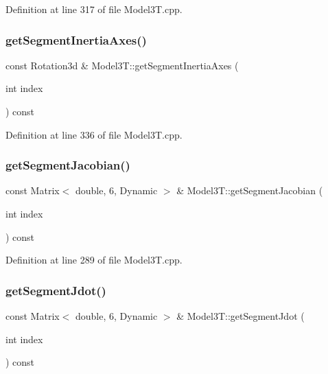 Definition at line 317 of file Model3\+T.\+cpp.

\hypertarget{classModel3T_a40cf731f4ab38620127021aaa68d387a}{}\label{classModel3T_a40cf731f4ab38620127021aaa68d387a} 
\subsubsection{\texorpdfstring{get\+Segment\+Inertia\+Axes()}{getSegmentInertiaAxes()}}
{\footnotesize\ttfamily const Rotation3d \& Model3\+T\+::get\+Segment\+Inertia\+Axes (\begin{DoxyParamCaption}\item[{int}]{index }\end{DoxyParamCaption}) const\hspace{0.3cm}{\ttfamily [virtual]}}



Definition at line 336 of file Model3\+T.\+cpp.

\hypertarget{classModel3T_a3c138d685389144406ab0bd219e7bb36}{}\label{classModel3T_a3c138d685389144406ab0bd219e7bb36} 
\subsubsection{\texorpdfstring{get\+Segment\+Jacobian()}{getSegmentJacobian()}}
{\footnotesize\ttfamily const Matrix$<$ double, 6, Dynamic $>$ \& Model3\+T\+::get\+Segment\+Jacobian (\begin{DoxyParamCaption}\item[{int}]{index }\end{DoxyParamCaption}) const\hspace{0.3cm}{\ttfamily [virtual]}}



Definition at line 289 of file Model3\+T.\+cpp.

\hypertarget{classModel3T_a24e4def66a047175935bf343f38a8b84}{}\label{classModel3T_a24e4def66a047175935bf343f38a8b84} 
\subsubsection{\texorpdfstring{get\+Segment\+Jdot()}{getSegmentJdot()}}
{\footnotesize\ttfamily const Matrix$<$ double, 6, Dynamic $>$ \& Model3\+T\+::get\+Segment\+Jdot (\begin{DoxyParamCaption}\item[{int}]{index }\end{DoxyParamCaption}) const\hspace{0.3cm}{\ttfamily [virtual]}}



